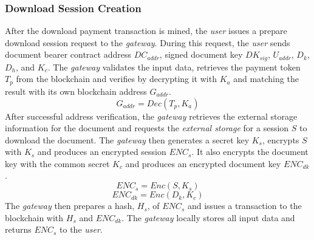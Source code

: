 \subsubsection{Download Session Creation}
After the download payment transaction is mined, the {\it user} issues a prepare download session request to the {\it gateway}. During this request, the {\it user} sends document bearer contract address $DC_{addr}$, signed document key $DK_{sig}$, $U_{addr}$, $D_k$, $D_{h}$, and $K_c$. The {\it gateway} validates the input data, retrieves the payment token $T_p$ from the blockchain and verifies by decrypting it with $K_a$ and matching the result with its own blockchain address $G_{addr}$. 
\begin{equation}
\label{eq-d-3}
G_{addr} = Dec (T_p, K_a)
\end{equation}
After successful address verification, the {\it gateway} retrieves the external storage information for the document and requests the {\it external storage} for a session $S$ to download the document. The {\it gateway} then generates a secret key $K_s$,  encrypts $S$ with $K_s$ and produces an encrypted session $ENC_s$. It also encrypts the document key with the common secret $K_c$ and produces an encrypted document key $ENC_{dk}$. 
\begin{equation}
\label{eq-d-4} 
ENC_s = Enc (S, K_s)
\end{equation}
\begin{equation}
\label{eq-d-5} 
ENC_{dk} = Enc (D_k, K_c)
\end{equation}
The {\it gateway} then prepares a hash, $H_s$, of $ENC_s$ and issues a transaction to the blockchain with $H_s$ and $ENC_{dk}$. The {\it gateway} locally stores all input data and returns $ENC_s$ to the {\it user}.


